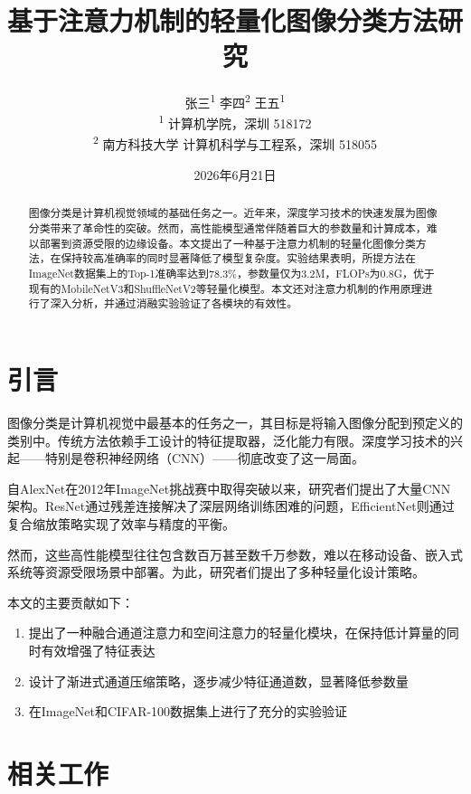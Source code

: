 \documentclass{harryopo-paper}
\title{基于注意力机制的轻量化图像分类方法研究}
\author{张三\textsuperscript{1} \quad 李四\textsuperscript{2} \quad 王五\textsuperscript{1}\\%
       {\small\textsuperscript{1} 计算机学院，深圳 518172}\\
       {\small\textsuperscript{2} 南方科技大学 计算机科学与工程系，深圳 518055}}
\date{2026年6月21日}
\begin{document}
\maketitle

\begin{abstract}
图像分类是计算机视觉领域的基础任务之一。近年来，深度学习技术的快速发展为图像分类带来了革命性的突破。然而，高性能模型通常伴随着巨大的参数量和计算成本，难以部署到资源受限的边缘设备。本文提出了一种基于注意力机制的轻量化图像分类方法，在保持较高准确率的同时显著降低了模型复杂度。实验结果表明，所提方法在ImageNet数据集上的Top-1准确率达到78.3\%，参数量仅为3.2M，FLOPs为0.8G，优于现有的MobileNetV3和ShuffleNetV2等轻量化模型。本文还对注意力机制的作用原理进行了深入分析，并通过消融实验验证了各模块的有效性。
\end{abstract}


\section{引言}

图像分类是计算机视觉中最基本的任务之一，其目标是将输入图像分配到预定义的类别中\cite{lecun2015deep}。传统方法依赖手工设计的特征提取器，泛化能力有限。深度学习技术的兴起——特别是卷积神经网络（CNN）——彻底改变了这一局面。

自AlexNet\cite{krizhevsky2012imagenet}在2012年ImageNet挑战赛中取得突破以来，研究者们提出了大量CNN架构。ResNet\cite{he2016deep}通过残差连接解决了深层网络训练困难的问题，EfficientNet\cite{tan2019efficientnet}则通过复合缩放策略实现了效率与精度的平衡。

然而，这些高性能模型往往包含数百万甚至数千万参数，难以在移动设备、嵌入式系统等资源受限场景中部署。为此，研究者们提出了多种轻量化设计策略。

本文的主要贡献如下：
\begin{enumerate}
    \item 提出了一种融合通道注意力和空间注意力的轻量化模块，在保持低计算量的同时有效增强了特征表达
    \item 设计了渐进式通道压缩策略，逐步减少特征通道数，显著降低参数量
    \item 在ImageNet和CIFAR-100数据集上进行了充分的实验验证
\end{enumerate}

\section{相关工作}
\end{document}
